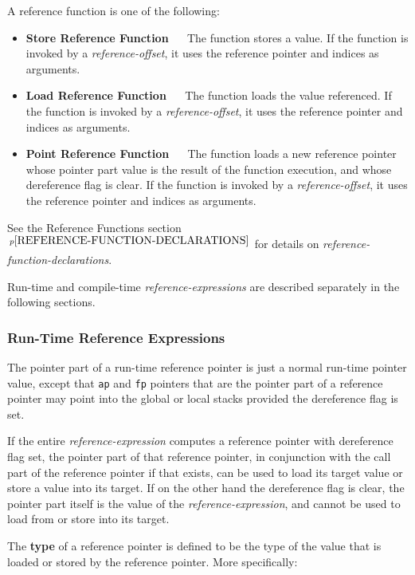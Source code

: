 \documentclass[12pt]{article}
\newcommand{\key}[1]{{\rm \bfseries #1}}
\newcommand{\pagnote}[1]{$\,^{p\pageref{#1}}$}
\begin{document}
A reference function is one of the following:
\begin{itemize}
\item \key{Store Reference Function} ~~
The function stores a value.  If the function is invoked by a
{\em reference-offset}, it uses the reference pointer and indices as
arguments.
\item \key{Load Reference Function} ~~
The function loads the value referenced.  If the function is invoked by a
{\em reference-offset}, it uses the reference pointer and indices as
arguments.
\item \key{Point Reference Function} ~~
The function loads a new reference pointer whose pointer part value is
the result of the function execution, and whose dereference flag is
clear.
If the function is invoked by a
{\em reference-offset}, it uses the reference pointer and indices as
arguments.
\end{itemize}

See the Reference Functions section\pagnote{REFERENCE-FUNCTION-DECLARATIONS}
for details on {\em reference-function-declarations}.

Run-time and compile-time {\em reference-expressions} are described
separately in the following sections.

\subsubsection{Run-Time Reference Expressions}
\label{RUN-TIME-REFERENCE-EXPRESSIONS}

The pointer part of a run-time reference pointer is just
a normal run-time pointer value, except that
{\tt ap} and {\tt fp} pointers that are the pointer part
of a reference pointer may point
into the global or local stacks provided the dereference flag is set.

If the entire {\em reference-expression} computes a reference pointer
with dereference flag set, the pointer part of that reference pointer,
in conjunction with the call part of the reference pointer if that exists,
can be used to load its target value or store a value into its target.
If on the other hand the dereference flag is clear, the pointer part
itself is the value of the {\em reference-expression}, and cannot
be used to load from or store into its target.

The \key{type} of a reference pointer
is defined to be the type of the value
that is loaded or stored by the reference pointer.  More specifically:

\bigskip
\end{document}
